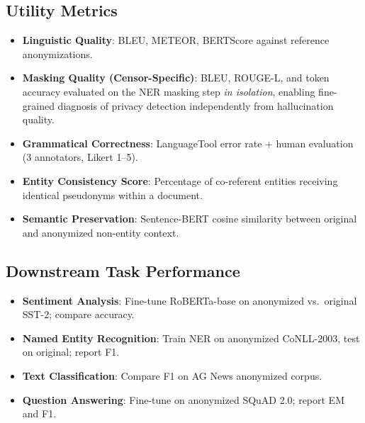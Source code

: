 \documentclass[9pt]{article}
\begin{document}
\subsection{Utility Metrics}
\begin{itemize}
    \item \textbf{Linguistic Quality}: BLEU, METEOR, BERTScore against reference anonymizations.
    \item \textbf{Masking Quality (Censor-Specific)}: BLEU, ROUGE-L, and token accuracy evaluated on the NER masking step \textit{in isolation}, enabling fine-grained diagnosis of privacy detection independently from hallucination quality.
    \item \textbf{Grammatical Correctness}: LanguageTool error rate + human evaluation (3 annotators, Likert 1--5).
    \item \textbf{Entity Consistency Score}: Percentage of co-referent entities receiving identical pseudonyms within a document.
    \item \textbf{Semantic Preservation}: Sentence-BERT cosine similarity between original and anonymized non-entity context.
\end{itemize}

\subsection{Downstream Task Performance}
\begin{itemize}
    \item \textbf{Sentiment Analysis}: Fine-tune RoBERTa-base on anonymized vs.\ original SST-2; compare accuracy.
    \item \textbf{Named Entity Recognition}: Train NER on anonymized CoNLL-2003, test on original; report F1.
    \item \textbf{Text Classification}: Compare F1 on AG News anonymized corpus.
    \item \textbf{Question Answering}: Fine-tune on anonymized SQuAD 2.0; report EM and F1.
\end{itemize}
\end{document}
